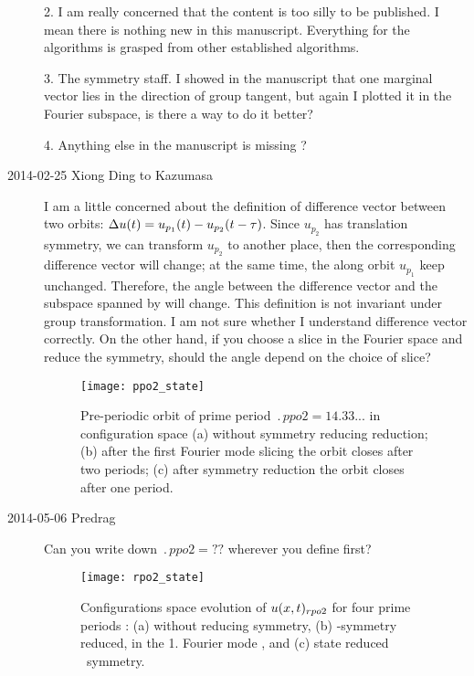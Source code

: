 \begin{description}
2. I am really concerned that the content is too silly to be published.
I mean there is nothing new in this manuscript. Everything for the
algorithms is grasped from other established algorithms.

3. The symmetry staff. I showed in the manuscript that one marginal
vector lies in the direction of group tangent, but again I plotted
it in the Fourier subspace, is there a way to do it better?

4. Anything else in the manuscript is missing ?

\item[2014-02-25 Xiong Ding to Kazumasa]

I am a little concerned about the definition of difference vector between
two orbits: $\Delta u(t)=u_{p_1}(t)-u_{p_2}(t-\tau)$. Since $u_{p_2}$ has
translation symmetry, we can transform $u_{p_2}$ to another place,
then the corresponding difference vector will change; at the same time,
the {\cLvs} along orbit $u_{p_1}$ keep unchanged. Therefore,
the angle between the difference vector and the subspace spanned by
{\cLvs} will change. This definition is not invariant
under group transformation. I am not
sure whether I understand difference vector correctly.
On the other hand, if you choose a slice in the Fourier space and
reduce the  symmetry, should the angle depend on the choice of
slice?

\begin{figure}[h]
  \centering
  \texttt{[image: ppo2\_state]}
  \caption{
Pre-periodic orbit  of prime period  $\period{ppo2} =14.33...$
in configuration space
(a) without symmetry reducing reduction;
(b) after the first Fourier mode  slicing the orbit
closes after two periods;
(c) after  symmetry reduction the orbit closes after one
period.
    }
  \label{fig:ppo2_states_reduced}
\end{figure}

\item[2014-05-06 Predrag] Can you write down $\period{ppo2} =??$
    wherever you define  first?

\begin{figure}[h]
  \centering
  \texttt{[image: rpo2\_state]}
  \caption{Configurations space evolution of
$u(x,t)_{rpo2}$ for four prime periods : (a) without reducing symmetry,  (b)
-symmetry reduced, in the 1. Fourier mode
\slice, and  (c) state reduced \ symmetry.}
  \label{fig:rpo2_states_reduced}
\end{figure}



\end{description}
